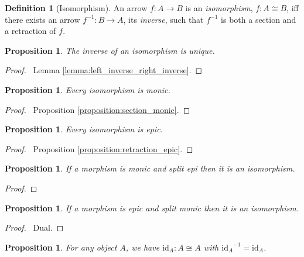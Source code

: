 \documentclass{article}
\let\qed\relax
\newtheorem{proposition}[axiom]{Proposition}
\theoremstyle{definition}
\newtheorem{definition}[axiom]{Definition}
\newcommand{\inv}[1]{\ensuremath{{#1}^{-1}}}
\newcommand{\id}[1]{\ensuremath{\mathrm{id}_{#1}}}
\begin{document}
\begin{definition}[Isomorphism]
    An arrow $f : A \rightarrow B$ is an \emph{isomorphism}, $f : A \cong B$, iff there exists an arrow
    $\inv{f} : B \rightarrow A$, its \emph{inverse}, such that $\inv{f}$ is both a
    section and a retraction of $f$.
\end{definition}

\begin{proposition}
    The inverse of an isomorphism is unique.
\end{proposition}

\begin{proof}
    \pf\ Lemma \ref{lemma:left_inverse_right_inverse}. \qed
\end{proof}

\begin{proposition}
    Every isomorphism is monic.
\end{proposition}

\begin{proof}
    \pf\ Proposition \ref{proposition:section_monic}. \qed
\end{proof}

\begin{proposition}
    Every isomorphism is epic.
\end{proposition}

\begin{proof}
    \pf\ Proposition \ref{proposition:retraction_epic}. \qed
\end{proof}

\begin{proposition}
    If a morphism is monic and split epi then it is an isomorphism.
\end{proposition}

\begin{proof}
    \pf
    \step{3}{$s \circ f = \id{A}$}
    \qed
\end{proof}

\begin{proposition}
    If a morphism is epic and split monic then it is an isomorphism.
\end{proposition}

\begin{proof}
    \pf\ Dual. \qed
\end{proof}

\begin{proposition}
    For any object $A$, we have $\id{A} : A \cong A$ with $\inv{\id{A}} = \id{A}$.
\end{proposition}
\end{document}
